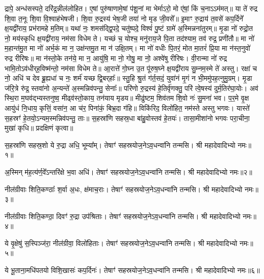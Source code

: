 
द्रापे॒ अन्ध॑सस्पते॒ दरि॑द्र॒न्नील॑लोहित। ए॒षां पुरु॑षाणामे॒षां प॑शू॒नां मा भेर्माऽरो॒ मो ए॑षां॒ किं च॒नाऽऽम॑मत्॥ या ते॑ रुद्र शि॒वा त॒नूः शि॒वा वि॒श्वाह॑भेषजी। शि॒वा रु॒द्रस्य॑ भेष॒जी तया॑ नो मृड जी॒वसे᳚॥ इ॒माꣳ रु॒द्राय॑ त॒वसे॑ कप॒र्दिने᳚ क्ष॒यद्वी॑राय॒ प्रभ॑रामहे म॒तिम्॥ यथा॑ नः॒ शमस॑द्द्वि॒पदे॒ चतु॑ष्पदे॒ विश्वं॑ पु॒ष्टं ग्रामे॑ अ॒स्मिन्नना॑तुरम्॥ मृ॒डा नो॑ रुद्रो॒त नो॒ मय॑स्कृधि क्ष॒यद्वी॑राय॒ नम॑सा विधेम ते। यच्छं च॒ योश्च॒ मनु॑राय॒जे पि॒ता तद॑श्याम॒ तव॑ रुद्र॒ प्रणी॑तौ॥ मा नो॑ म॒हान्त॑मु॒त मा नो॑ अर्भ॒कं मा न॒ उक्ष॑न्तमु॒त मा न॑ उक्षि॒तम्। मा नो॑ वधीः पि॒तरं॒ मोत मा॒तरं॑ प्रि॒या मा न॑स्त॒नुवो॑ रुद्र रीरिषः॥ मा न॑स्तो॒के तन॑ये॒ मा न॒ आयु॑षि॒ मा नो॒ गोषु॒ मा नो॒ अश्वे॑षु रीरिषः। वी॒रान्मा नो॑ रुद्र भामि॒तोऽव॑धीर्‌ह॒विष्म॑न्तो॒ नम॑सा विधेम ते॥ आ॒रात्ते॑ गो॒घ्न उ॒त पू॑रुष॒घ्ने क्ष॒यद्वी॑राय सु॒म्नम॒स्मे ते॑ अस्तु। रक्षा॑ च नो॒ अधि॑ च देव ब्रू॒ह्यधा॑ च नः॒ शर्म॑ यच्छ द्वि॒बर्‌हाः᳚॥ स्तु॒हि श्रु॒तं ग॑र्त॒सदं॒ युवा॑नं मृ॒गं न भी॒ममु॑पह॒त्नुमु॒ग्रम्। मृ॒डा ज॑रि॒त्रे रु॑द्र॒ स्तवा॑नो अ॒न्यन्ते॑ अ॒स्मन्निव॑पन्तु॒ सेनाः᳚॥ परि॑णो रु॒द्रस्य॑ हे॒तिर्वृ॑णक्तु॒ परि॑ त्वे॒षस्य॑ दुर्म॒तिर॑घा॒योः। अव॑ स्थि॒रा म॒घव॑द्भ्यस्तनुष्व॒ मीढ्व॑स्तो॒काय॒ तन॑याय मृडय॥ मीढु॑ष्टम॒ शिव॑तम शि॒वो नः॑ सु॒मना॑ भव। प॒र॒मे वृ॒क्ष आयु॑धं नि॒धाय॒ कृत्तिं॒ वसा॑न॒ आ च॑र॒ पिना॑कं॒ बिभ्र॒दा ग॑हि॥ विकि॑रिद॒ विलो॑हित॒ नम॑स्ते अस्तु भगवः। यास्ते॑ स॒हस्रꣳ॑ हे॒तयो॒ऽन्यम॒स्मन्निव॑पन्तु॒ ताः॥ स॒हस्रा॑णि सहस्र॒धा बा॑हु॒वोस्तव॑ हे॒तयः॑। तासा॒मीशा॑नो भगवः परा॒चीना॒ मुखा॑ कृधि॥
प्रदक्षिणं कृत्वा॥


{\small \closesection}



स॒हस्रा॑णि सहस्र॒शो ये रु॒द्रा अधि॒ भूम्या᳚म्। तेषाꣳ॑ सहस्रयोज॒ने\-ऽव॒धन्वा॑नि तन्मसि। श्री महादेवादिभ्यो नमः॥१॥

अ॒स्मिन् म॑ह॒त्य॑र्ण॒वे᳚ऽन्तरि॑क्षे भ॒वा अधि॑। तेषाꣳ॑ सहस्रयोज॒ने\-ऽव॒धन्वा॑नि तन्मसि। श्री महादेवादिभ्यो नमः॥२॥

नील॑ग्रीवाः शिति॒कण्ठाः᳚ श॒र्वा अ॒धः, क्ष॑माच॒राः। तेषाꣳ॑ सहस्रयोज॒ने\-ऽव॒धन्वा॑नि तन्मसि। श्री महादेवादिभ्यो नमः॥३॥

नील॑ग्रीवाः शिति॒कण्ठा॒ दिवꣳ॑ रु॒द्रा उप॑श्रिताः। तेषाꣳ॑ सहस्रयोज॒ने\-ऽव॒धन्वा॑नि तन्मसि। श्री महादेवादिभ्यो नमः॥४॥

ये वृ॒क्षेषु॑ स॒स्पिञ्ज॑रा॒ नील॑ग्रीवा॒ विलो॑हिताः। तेषाꣳ॑ सहस्रयोज॒ने\-ऽव॒धन्वा॑नि तन्मसि। श्री महादेवादिभ्यो नमः॥५॥

ये भू॒ताना॒मधि॑पतयो विशि॒खासः॑ कप॒र्दिनः॑। तेषाꣳ॑ सहस्रयोज॒ने\-ऽव॒धन्वा॑नि तन्मसि। श्री महादेवादिभ्यो नमः॥६॥

